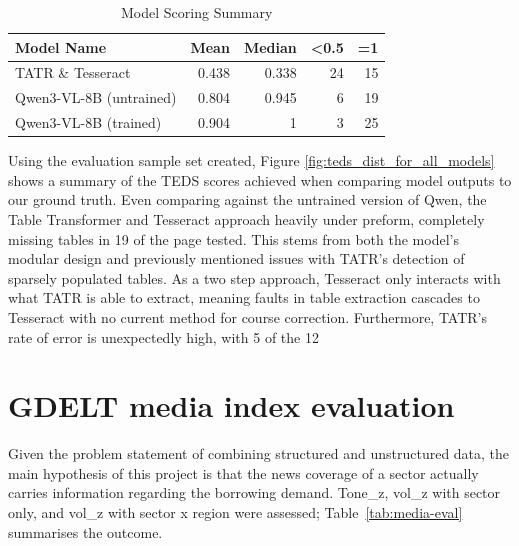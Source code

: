 \documentclass[ %
                    author={Natchalin Iwsakul \\ Inkaphol Siriwongwattana \\ Tanaphan Kummaraphat \\ Patorn Srisupap},
                supervisor={Fernando Moreno-Pino},
                    degree={MSc},
                     title={Propensity Modelling for SME Commercial Lending Using Open Public Data},
                  subtitle={Companies House filings and GDELT media coverage as predictors of first-time borrowing},
                      type={},
                      year={2026}]{dissertation}
\begin{document}
\begin{table}[H]
    \centering
    \begin{tabular}{l|r|r|r|r}
         Model Name & Mean & Median & \textless 0.5 & =1 \\
         \toprule
         TATR \& Tesseract & 0.438 & 0.338 & 24 & 15\\
         Qwen3-VL-8B (untrained) & 0.804 & 0.945 & 6 & 19\\
         Qwen3-VL-8B (trained) & 0.904 & 1 & 3 & 25
    \end{tabular}
    \caption{Model Scoring Summary}
    \label{tab:placeholder}
\end{table}

Using the evaluation sample set created, Figure \ref{fig:teds_dist_for_all_models} shows a summary of the TEDS scores achieved when comparing model outputs to our ground truth. Even comparing against the untrained version of Qwen, the Table Transformer and Tesseract approach heavily under preform, completely missing tables in 19 of the page tested. This stems from both the model's modular design and previously mentioned issues with TATR's detection of sparsely populated tables. As a two step approach, Tesseract only interacts with what TATR is able to extract, meaning faults in table extraction cascades to Tesseract with no current method for course correction. Furthermore, TATR's rate of error is unexpectedly high, with 5 of the 12

\section{GDELT media index evaluation}
\label{sec:eval-media}

Given the problem statement of combining structured and unstructured data, the main hypothesis of this project is that the news coverage of a sector actually carries information regarding the borrowing demand. Tone\_z, vol\_z with sector only, and vol\_z with sector x region were assessed; Table~\ref{tab:media-eval} summarises the outcome.
\end{document}
